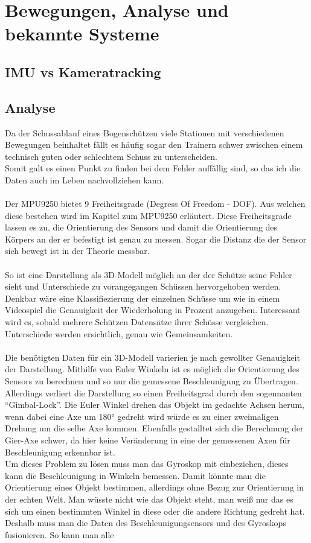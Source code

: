\chapter{Bewegungen, Analyse und bekannte Systeme}
\section{IMU vs Kameratracking}


\section{Analyse}
Da der Schussablauf eines Bogenschützen viele Stationen mit verschiedenen Bewegungen 
beinhaltet fällt es häufig sogar den Trainern schwer zwischen einem technisch guten
oder schlechtem Schuss zu unterscheiden.\\ 
Somit galt es einen Punkt zu finden bei dem Fehler auffällig sind, so das ich die Daten auch im 
Leben nachvollziehen kann.\\
\\
Der MPU9250 bietet 9 Freiheitsgrade (Degress Of Freedom - DOF). Aus welchen diese bestehen wird
im Kapitel zum MPU9250 erläutert. Diese Freiheitsgrade lassen es zu, die Orientierung des Sensors 
und damit die Orientierung des Körpers an der er befestigt ist genau zu messen. Sogar die Distanz 
die der Sensor sich bewegt ist in der Theorie messbar.\\
\\
So ist eine Darstellung als 3D-Modell möglich an der der Schütze seine Fehler sieht und Unterschiede
zu vorangegangen Schüssen hervorgehoben werden. \\
Denkbar wäre eine Klassifiezierung der einzelnen Schüsse um wie in einem Videospiel die Genauigkeit
der Wiederholung in Prozent anzugeben. Interessant wird es, sobald mehrere Schützen Datensätze
ihrer Schüsse vergleichen. Unterschiede werden ersichtlich, genau wie Gemeinsamkeiten.\\
\\
Die benötigten Daten für ein 3D-Modell varierien je nach gewollter Genauigkeit der Darstellung.
Mithilfe von Euler Winkeln ist es möglich die Orientierung des Sensors zu berechnen und so nur
die gemessene Beschleunigung zu Übertragen. Allerdings verliert die Darstellung so einen
Freiheitsgrad durch den sogennanten ``Gimbal-Lock''. Die Euler Winkel drehen das Objekt im gedachte
Achsen herum, wenn dabei eine Axe um 180° gedreht wird würde es zu einer zweimaligen Drehung
um die selbe Axe kommen. Ebenfalls gestalltet sich die Berechnung der Gier-Axe schwer, da hier
keine Veränderung in eine der gemessenen Axen für Beschleunigung erkennbar ist.
\\
Um dieses Problem zu lösen muss man das Gyroskop mit einbeziehen, dieses kann die Beschleunigung
in Winkeln bemessen. Damit könnte man die Orientierung eines Objekt bestimmen, allerdings ohne 
Bezug zur Orientierung in der echten Welt. Man wüsste nicht wie das Objekt steht, man weiß nur 
das es sich um einen bestimmten Winkel in diese oder die andere Richtung gedreht hat. \\
Deshalb muss man die Daten des Beschleunigungsensors und des Gyroskops fusionieren. So kann man 
alle
\\

